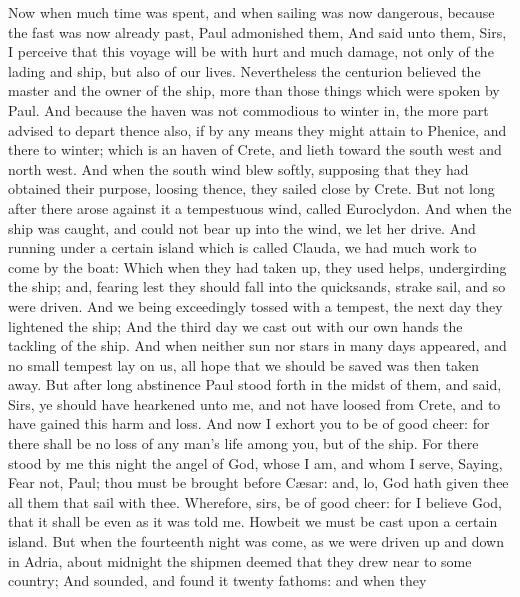  Now when much time was spent, and when sailing was now
dangerous, because the fast was now already past, Paul admonished them,
 And said unto them, Sirs, I perceive that this voyage
will be with hurt and much damage, not only of the lading and ship, but
also of our lives.  Nevertheless the centurion believed
the master and the owner of the ship, more than those things which were
spoken by Paul.  And because the haven was not commodious
to winter in, the more part advised to depart thence also, if by any
means they might attain to Phenice, and there to winter; which is an
haven of Crete, and lieth toward the south west and north west.
 And when the south wind blew softly, supposing that they
had obtained their purpose, loosing thence, they sailed close by Crete.
 But not long after there arose against it a tempestuous
wind, called Euroclydon.  And when the ship was caught,
and could not bear up into the wind, we let her drive. 
And running under a certain island which is called Clauda, we had much
work to come by the boat:  Which when they had taken up,
they used helps, undergirding the ship; and, fearing lest they should
fall into the quicksands, strake sail, and so were driven.
 And we being exceedingly tossed with a tempest, the next
day they lightened the ship;  And the third day we cast
out with our own hands the tackling of the ship.  And
when neither sun nor stars in many days appeared, and no small tempest
lay on us, all hope that we should be saved was then taken away.
 But after long abstinence Paul stood forth in the midst
of them, and said, Sirs, ye should have hearkened unto me, and not have
loosed from Crete, and to have gained this harm and loss.
 And now I exhort you to be of good cheer: for there
shall be no loss of any man's life among you, but of the ship.
 For there stood by me this night the angel of God, whose
I am, and whom I serve,  Saying, Fear not, Paul; thou
must be brought before Cæsar: and, lo, God hath given thee all them that
sail with thee.  Wherefore, sirs, be of good cheer: for I
believe God, that it shall be even as it was told me. 
Howbeit we must be cast upon a certain island.  But when
the fourteenth night was come, as we were driven up and down in Adria,
about midnight the shipmen deemed that they drew near to some country;
 And sounded, and found it twenty fathoms: and when they
